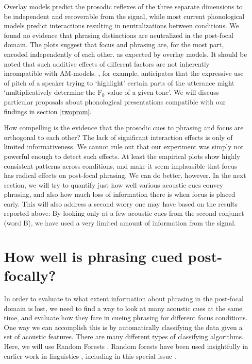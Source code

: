 \documentclass[preprint,review,12pt,authoryear,times]{elsarticle}
\begin{document}
Overlay models predict the prosodic reflexes of the three separate dimensions to be independent and recoverable from the signal, while most current phonological models predict interactions resulting in neutralizations between conditions. We found no evidence that phrasing distinctions are neutralized in the post-focal domain. The plots suggest that focus and phrasing are, for the most part, encoded independently of each other, as expected by overlay models. It should be noted  that such additive effects of different factors are not inherently incompatible with AM-models. \citet[18]{pierr80}, for example, anticipates that the expressive use of pitch of a speaker trying to `highlight' certain parts of the utterance might `multiplicatively determine the F$_0$ value of a given tone'.  We will discuss particular proposals about phonological presentations compatible with our findings in section \ref{twoprom}. 

How compelling is the evidence that the prosodic cues to phrasing and focus are orthogonal to each other? The lack of significant interaction effects is only of limited informativeness. We cannot rule out that our experiment was simply not powerful enough to detect such effects. At least the empirical plots show highly consistent patterns across conditions, and make it seem implausible that focus has radical effects on post-focal phrasing. We can do better, however. In the next section, we will try to quantify just how well various acoustic cues convey phrasing, and also how much loss of information there is when focus is placed early. This will also address a second worry one may have based on the results reported above: By looking only at a few acoustic cues from the second conjunct (word B), we have used a very limited amount of information from the signal. 


\section{How well is phrasing cued post-focally?}
\label{forest}

In order to evaluate to what extent information about phrasing in the post-focal domain is lost, we need to find a way to look at many acoustic cues at the same time, and evaluate how they fare in cueing phrasing for different focus conditions. One way we can accomplish this is by automatically classifying the data given a set of acoustic features. There are many different types of classifying algorithms. Here, we will use Random Forests \citep{breim01,strob09}. Random forests have been used insightfully in earlier work in linguistics \citep{tagli12,tao18,bauma18}, including in this special issue \citep{wagne19}. 
\end{document}
